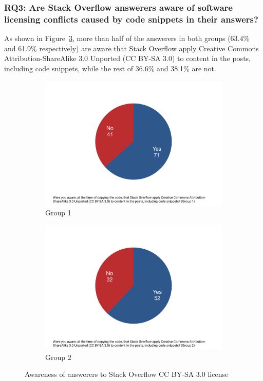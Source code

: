 \documentclass{svjour3}                     %
\begin{document}
\vspace{0.5cm}
\noindent{}
\vspace{0.5cm}

\subsubsection*{RQ3: Are Stack Overflow answerers aware of software licensing conflicts caused by code snippets in their answers?} 

As shown in Figure~\ref{fig:survey_license_known}, more than half of the
answerers in both groups (63.4\% and 61.9\% respectively) are aware that Stack
Overflow apply Creative Commons Attribution-ShareAlike 3.0 Unported (CC BY-SA
3.0) to content in the posts, including code snippets, while the rest of 36.6\%
and 38.1\% are not. 

\begin{figure}
	\begin{subfigure}{.5\textwidth}
		\centering
		\includegraphics[width=.4\linewidth]{survey_license_known_1}
		\caption{Group 1}
		\label{fig:survey_license_known_1}
	\end{subfigure}%
	\begin{subfigure}{.5\textwidth}
		\centering
		\includegraphics[width=.4\linewidth]{survey_license_known_2}
		\caption{Group 2}
		\label{fig:survey_license_known_2}
	\end{subfigure}
	\caption{Awareness of answerers to Stack Overflow CC BY-SA 3.0 license}
	\label{fig:survey_license_known}
\end{figure}
\end{document}
